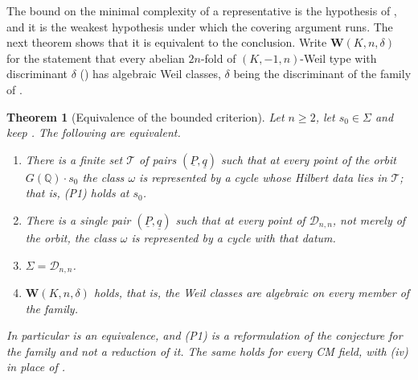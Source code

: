 \documentclass[11pt,reqno]{amsart}
\theoremstyle{plain}
\newtheorem{theorem}{Theorem}[section]
\theoremstyle{definition}
\theoremstyle{remark}
\newcommand{\QQ}{\mathbb{Q}}
\newcommand{\cD}{\mathcal{D}}
\begin{document}
The bound on the minimal complexity of a representative is the hypothesis of
, and it is the weakest hypothesis under which the
covering argument runs. The next theorem shows that it is equivalent to the
conclusion. Write $\mathbf{W}(K,n,\delta)$ for the statement that every
abelian $2n$-fold of $(K,-1,n)$-Weil type with discriminant $\delta$
() has algebraic Weil classes, $\delta$ being the discriminant
of the family of .

\begin{theorem}[Equivalence of the bounded criterion]\label{thm:p1equivalent}
Let $n\ge2$, let $s_{0}\in\Sigma$ and keep . The following
are equivalent.
\begin{enumerate}[label=\textup{(\alph*)},leftmargin=2.6em,itemsep=2pt]
\item There is a finite set $\mathcal{T}$ of pairs
  $(\underline{P},\underline{q})$ such that at every point of the orbit
  $G(\QQ)\cdot s_{0}$ the class $\omega$ is represented by a cycle whose
  Hilbert data lies in $\mathcal{T}$; that is, \textup{(P1)} holds at
  $s_{0}$.
\item There is a single pair $(\underline{P},\underline{q})$ such that at
  every point of $\cD_{n,n}$, not merely of the orbit, the class $\omega$ is
  represented by a cycle with that datum.
\item $\Sigma=\cD_{n,n}$.
\item $\mathbf{W}(K,n,\delta)$ holds, that is, the Weil classes are algebraic
  on every member of the family.
\end{enumerate}
In particular  is an equivalence, and \textup{(P1)} is a
reformulation of the conjecture for the family and not a reduction of it. The
same holds for every CM field, with (iv) in place of
.
\end{theorem}
\end{document}
